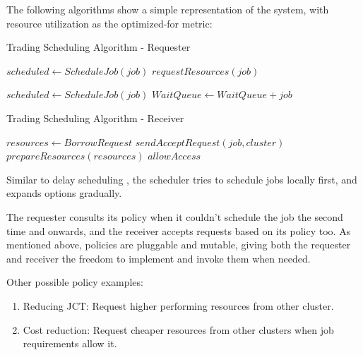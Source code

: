 The following algorithms show a simple representation of the system, with resource utilization as the 
optimized-for metric: \label{example}

\begin{algorithm}[H]
\caption{Trading Scheduling Algorithm - Requester}
\begin{algorithmic}
        \State $scheduled \gets ScheduleJob(job)$
        \State $requestResources(job)$
        \EndIf
    \EndFor

        \State $scheduled \gets ScheduleJob(job)$
        \State $WaitQueue \gets WaitQueue + job$
        \EndIf
    \EndFor
\end{algorithmic}
\end{algorithm}

\begin{algorithm}[H]
    \caption{Trading Scheduling Algorithm - Receiver}
    \begin{algorithmic}
            \State $ resources \gets BorrowRequest $  
            \State $sendAcceptRequest(job, cluster)$
            \State $prepareResources(resources)$
            \State $allowAccess$
            \EndIf
    \end{algorithmic}
\end{algorithm} 

Similar to delay scheduling \cite{zaharia_delay_2010}, the scheduler tries to schedule jobs locally first, and 
expands options gradually. 

The requester consults its policy when it couldn't schedule the job the second time and onwards, and the receiver 
accepts requests based on its policy too. As mentioned above, policies are pluggable and mutable, giving both the requester 
and receiver the freedom to implement and invoke them when needed.

Other possible policy examples:
\begin{enumerate}
    \item Reducing JCT: Request higher performing resources from other cluster. \label{jct} 
    \item Cost reduction: Request cheaper resources from other clusters when job requirements allow it. \label{cost} 
\end{enumerate}

